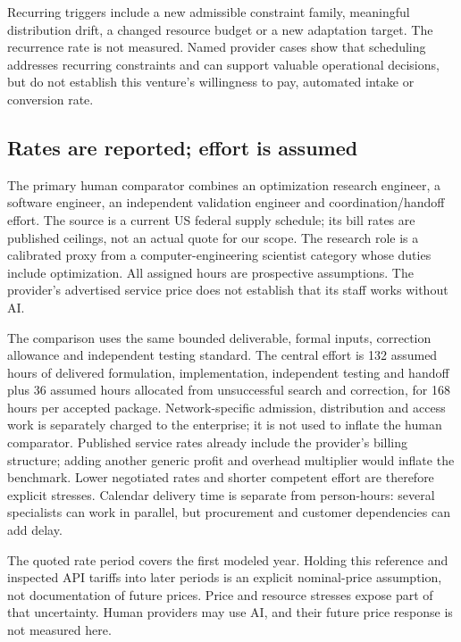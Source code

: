\documentclass[11pt,a4paper]{article}
\begin{document}


Recurring triggers include a new admissible constraint family, meaningful distribution drift, a changed resource budget or a new adaptation target. The recurrence rate is not measured. Named provider cases show that scheduling addresses recurring constraints and can support valuable operational decisions, but do not establish this venture's willingness to pay, automated intake or conversion rate.\cite{Hexaly}

\subsection{Rates are reported; effort is assumed}

The primary human comparator combines an optimization research engineer, a software engineer, an independent validation engineer and coordination/handoff effort. The source is a current US federal supply schedule; its bill rates are published ceilings, not an actual quote for our scope. The research role is a calibrated proxy from a computer-engineering scientist category whose duties include optimization. All assigned hours are prospective assumptions. The provider's advertised service price does not establish that its staff works without AI.\cite{SIMS,GSA}



The comparison uses the same bounded deliverable, formal inputs, correction allowance and independent testing standard. The central effort is 132 assumed hours of delivered formulation, implementation, independent testing and handoff plus 36 assumed hours allocated from unsuccessful search and correction, for 168 hours per accepted package. Network-specific admission, distribution and access work is separately charged to the enterprise; it is not used to inflate the human comparator. Published service rates already include the provider's billing structure; adding another generic profit and overhead multiplier would inflate the benchmark. Lower negotiated rates and shorter competent effort are therefore explicit stresses. Calendar delivery time is separate from person-hours: several specialists can work in parallel, but procurement and customer dependencies can add delay.

The quoted rate period covers the first modeled year. Holding this reference and inspected API tariffs into later periods is an explicit nominal-price assumption, not documentation of future prices. Price and resource stresses expose part of that uncertainty. Human providers may use AI, and their future price response is not measured here.
\end{document}
